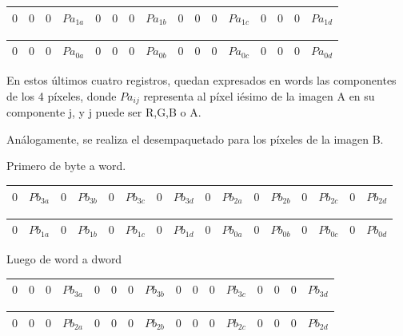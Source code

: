 \begin{enumerate}
\begin{tabular}{| o | o | o | o | o | o | o | o | o | o | o | o | o | o | o | o |} %
\hline
$0$ & $0$ & $0$ & $Pa_{1a}$ & $0$ & $0$ & $0$ & $Pa_{1b}$ & $0$ & $0$ & $0$ & $Pa_{1c}$ & $0$ & $0$ & $0$ & $Pa_{1d}$\\ 
\hline
\end{tabular}

\begin{tabular}{| o | o | o | o | o | o | o | o | o | o | o | o | o | o | o | o |} %
\hline
$0$ & $0$ & $0$ & $Pa_{0a}$ & $0$ & $0$ & $0$ & $Pa_{0b}$ & $0$ & $0$ & $0$ & $Pa_{0c}$ & $0$ & $0$ & $0$ & $Pa_{0d}$ \\ 
\hline
\end{tabular}

En estos últimos cuatro registros, quedan expresados en words las componentes de los 4 píxeles, donde $Pa_{ij}$ representa al píxel iésimo de la imagen A en su componente j, y j puede ser R,G,B o A.

Análogamente, se realiza el desempaquetado para los píxeles de la imagen B. 

Primero de byte a word.

\begin{tabular}{| g | g | g | g | g | g | g | g | g | g | g | g | g | g | g | g |} %
\hline
$0$ & $Pb_{3a}$ & $0$ & $Pb_{3b}$ & $0$ & $Pb_{3c}$ & $0$ & $Pb_{3d}$ & $0$ & $Pb_{2a}$ & $0$ & $Pb_{2b}$ & $0$ & $Pb_{2c}$ & $0$ & $Pb_{2d}$ \\ 
\hline
\end{tabular}


\begin{tabular}{| g | g | g | g | g | g | g | g | g | g | g | g | g | g | g | g |}
\hline
$0$ & $Pb_{1a}$ & $0$ & $Pb_{1b}$ & $0$ & $Pb_{1c}$ & $0$ & $Pb_{1d}$ & $0$ & $Pb_{0a}$ & $0$ & $Pb_{0b}$ & $0$ & $Pb_{0c}$ & $0$ & $Pb_{0d}$ \\ 
\hline
\end{tabular}

Luego de word a dword

\begin{tabular}{| g | g | g | g | g | g | g | g | g | g | g | g | g | g | g | g |}
\hline
$0$ & $0$ & $0$ & $Pb_{3a}$ & $0$ & $0$ & $0$ & $Pb_{3b}$ & $0$ & $0$ & $0$ & $Pb_{3c}$ & $0$ & $0$ & $0$ & $Pb_{3d}$ \\ 
\hline
\end{tabular}

\begin{tabular}{| g | g | g | g | g | g | g | g | g | g | g | g | g | g | g | g |}
\hline
$0$ & $0$ & $0$ & $Pb_{2a}$ & $0$ & $0$ & $0$ & $Pb_{2b}$ & $0$ & $0$ & $0$ & $Pb_{2c}$ & $0$ & $0$ & $0$ & $Pb_{2d}$ \\ 
\hline
\end{tabular}


\end{enumerate}
